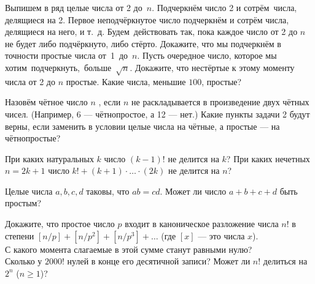 \documentclass[a4paper,11pt]{article}
\begin{document}
\def\a{\alpha}




\!\!\!\! \!\!\!
Выпишем в ряд целые числа от 2 до~$n$. Подчеркн\"ем число
2 и сотр\"ем~\hbox{числа,} делящиеся на 2.
Первое неподч\"еркнутое число подчеркн\"ем и сотр\"ем %
числа, делящиеся на него, и т.~д.
Будем~действовать так, пока каждое число от 2 до $n$
не будет либо подч\"еркнуто, либо ст\"ерто.
Докажите, что мы подчерк\-н\"ем в точности простые числа
от~1~до~$n$.\!
\!\!\! Пусть очередное число, которое мы хотим~\hbox{подчеркнуть, больше $\sqrt{n}$.}
Докажите, что не\-ст\"ер\-тые к этому моменту числа от 2 до $n$ простые.
 Какие числа, меньшие $100$, простые?


Назов\"ем ч\"етное число $n$ , если $n$
не раскладывается
в произведение двух ч\"етных чисел. (Например, 6 --- ч\"етнопростое,
а 12 --- нет.)
Какие пункты задачи 2 будут верны, если
заменить в условии целые числа на ч\"етные, а
простые %
--- на ч\"етнопростые?

 При каких натуральных $k$ число $(k-1)!$ не делится на $k$?
 При каких нечетных $n=2k+1$ число $k!+(k+1)\cdot\ldots\cdot(2k)$ не делится на $n$?


Целые числа $a,b,c,d$ таковы, что $ab=cd$. Может ли число $a+b+c+d$ быть простым?

 Докажите, что простое число
$p$ входит в каноническое разложение числа $n!$
в степени $[n/p]+[n/p^2]+[n/{p^3}]+\dots$
(где $[x]$ --- это  числа $x$).\\
С какого момента слагаемые в этой сумме станут равными нулю?\\
 Сколько у $2000!$ нулей в конце его десятичной записи?
 Может ли $n!$ делиться на $2^n$ ($n\geq1$)?
\end{document}

